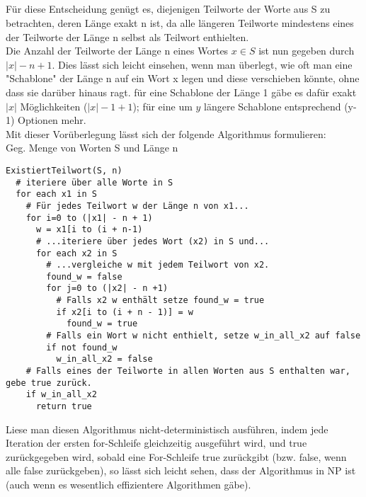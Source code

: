 \documentclass[fleqn]{article}
\begin{document}
\subsection{}%
Für diese Entscheidung genügt es, diejenigen Teilworte der Worte aus S zu betrachten, deren Länge exakt n ist, da alle längeren Teilworte mindestens eines der Teilworte der Länge n selbst als Teilwort enthielten.\\
Die Anzahl der Teilworte der Länge n eines Wortes $x \in S$ ist nun gegeben durch $|x| - n + 1$. Dies lässt sich leicht einsehen, wenn man überlegt, wie oft man eine "Schablone" der Länge n auf ein Wort x legen und diese verschieben könnte, ohne dass sie darüber hinaus ragt. für eine Schablone der Länge 1 gäbe es dafür exakt $|x|$ Möglichkeiten ($|x| - 1 + 1$); für eine um $y$ längere Schablone entsprechend (y-1) Optionen mehr.\\
Mit dieser Vorüberlegung lässt sich der folgende Algorithmus formulieren:\\
\newpage
Geg. Menge von Worten S und Länge n
\begin{lstlisting}
ExistiertTeilwort(S, n)
  # iteriere über alle Worte in S
  for each x1 in S
    # Für jedes Teilwort w der Länge n von x1...
    for i=0 to (|x1| - n + 1)
      w = x1[i to (i + n-1)
      # ...iteriere über jedes Wort (x2) in S und...
      for each x2 in S
        # ...vergleiche w mit jedem Teilwort von x2.
        found_w = false
        for j=0 to (|x2| - n +1)
          # Falls x2 w enthält setze found_w = true
          if x2[i to (i + n - 1)] = w
            found_w = true
        # Falls ein Wort w nicht enthielt, setze w_in_all_x2 auf false
        if not found_w
          w_in_all_x2 = false
    # Falls eines der Teilworte in allen Worten aus S enthalten war, gebe true zurück.
    if w_in_all_x2
      return true
\end{lstlisting}

Liese man diesen Algorithmus nicht-deterministisch ausführen, indem jede Iteration der ersten for-Schleife gleichzeitig ausgeführt wird, und true zurückgegeben wird, sobald eine For-Schleife true zurückgibt (bzw. false, wenn alle false zurückgeben), so lässt sich leicht sehen, dass der Algorithmus in NP ist (auch wenn es wesentlich effizientere Algorithmen gäbe).

\section{}%
\subsection{}%
\end{document}
